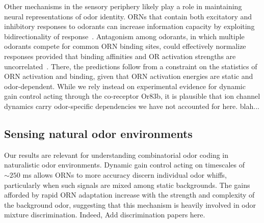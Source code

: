 Other mechanisms in the sensory periphery likely play a role in maintaining neural representations of odor identity. ORNs that contain both excitatory and inhibitory responses to odorants can increase information capacity by exploiting bidirectionality of response~\cite{Cao_Tu_WL}. %
Antagonism among odorants, in which multiple odorants compete for common ORN binding sites, could effectively normalize responses provided that binding affinities and OR activation strengths are uncorrelated~\cite{reddy2017antagonism}. There, the predictions follow from a constraint on the statistics of ORN activation and binding, given that ORN activation energies are static and odor-dependent. While we rely instead on experimental evidence for dynamic gain control acting through the co-receptor Or83b, it is plausible that ion channel dynamics carry odor-specific dependencies we have not accounted for here. {\color {blue} blah..}.

\subsection{Sensing natural odor environments}

Our results are relevant for understanding combinatorial odor coding in naturalistic odor environments. Dynamic gain control acting on timescales of $\sim 250$ ms allows ORNs to more accuracy discern individual odor whiffs, particularly when such signals are mixed among static backgrounds. The gains afforded by rapid ORN adaptation increase with the strength and complexity of the background odor, suggesting that this mechanism is heavily involved in odor mixture discrimination. %
Indeed, {\color {blue} Add discrimination papers here}.




